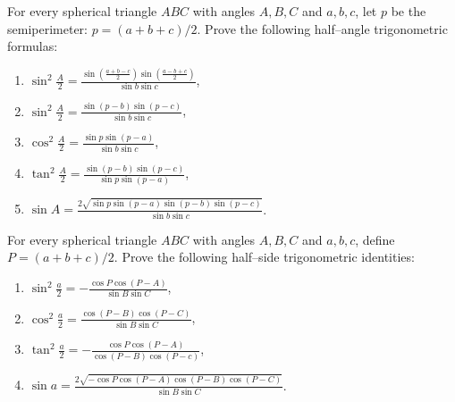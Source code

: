 \begin{tcolorbox}[title={Half--Angle and Half--Side Spherical Formulas}]
    \begin{question}
        For every spherical triangle $ABC$ with angles $A,B,C$ and $a,b,c$, let $p$ be the semiperimeter: $p=(a+b+c)/2$. Prove the following half--angle trigonometric formulas:
    \begin{enumerate}
        \item $\displaystyle \sin^2\frac{A}{2} = \frac{\sin\left(\frac{a+b-c}{2}\right)\sin\left(\frac{a-b+c}{2}\right)}{\sin b \sin c}$,
        \item $\displaystyle \sin^2\frac{A}{2} = \frac{\sin(p-b)\sin(p-c)}{\sin b \sin c}$,
        \item $\displaystyle \cos^2\frac{A}{2} = \frac{\sin p\sin(p-a)}{\sin b \sin c}$,
        \item $\displaystyle \tan^2\frac{A}{2} = \frac{\sin(p-b)\sin(p-c)}{\sin p\sin(p-a)}$,
        \item $\displaystyle \sin A = \frac{2\sqrt{\sin p \sin(p-a)\sin(p-b)\sin(p-c)}}{\sin b \sin c}$.
    \end{enumerate}
    \end{question}
    \begin{question}
        For every spherical triangle $ABC$ with angles $A,B,C$ and $a,b,c$, define $P=(a+b+c)/2$. Prove the following half--side trigonometric identities:
    \begin{enumerate}
        \item $\displaystyle \sin^2\frac{a}{2} = -\frac{\cos P\cos(P-A)}{\sin B \sin C}$,
        \item $\displaystyle \cos^2\frac{a}{2} = \frac{\cos(P-B)\cos(P-C)}{\sin B \sin C}$,
        \item $\displaystyle \tan^2\frac{a}{2} = -\frac{\cos P \cos(P-A)}{\cos(P-B)\cos(P-c)}$,
        \item $\displaystyle \sin a = \frac{2\sqrt{-\cos P \cos(P-A)\cos(P-B)\cos(P-C)}}{\sin B \sin C}$.
    \end{enumerate}
    \end{question}
\end{tcolorbox}

